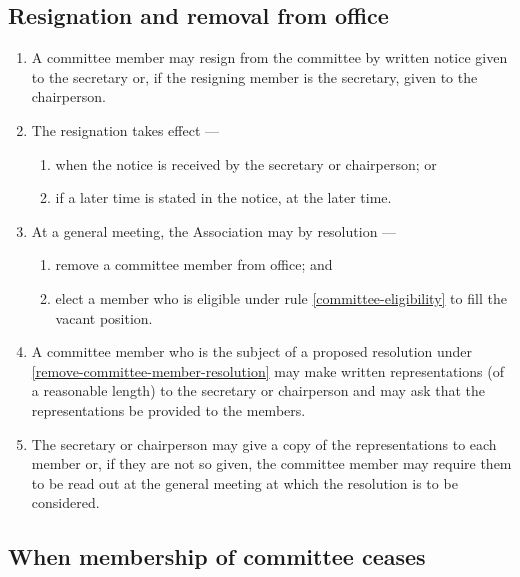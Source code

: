 \documentclass[../constitution.tex]{subfiles}
\begin{document}
\hypertarget{resignation-and-removal-from-office}{%
\subsection{Resignation and removal from office}\label{resignation-and-removal-from-office}}

\begin{enumerate}

\item A committee member may resign from the committee by written notice given to the secretary or, if the resigning member is the secretary, given to the chairperson.
\item The resignation takes effect ---

  \begin{enumerate}
  
  \item when the notice is received by the secretary or chairperson; or
  \item if a later time is stated in the notice, at the later time.
  \end{enumerate}
\item At a general meeting, the Association may by resolution --- 

  \begin{enumerate}
  
  \item remove a committee member from office; and \label{remove-committee-member-resolution}
  \item elect a member who is eligible under rule \ref{committee-eligibility} to fill the vacant position. \label{elect-committee-at-general-meeting}
  \end{enumerate}
\item A committee member who is the subject of a proposed resolution under  \ref{remove-committee-member-resolution} may make written representations (of a reasonable length) to the secretary or chairperson and may ask that the representations be provided to the members.
\item The secretary or chairperson may give a copy of the representations to each member or, if they are not so given, the committee member may require them to be read out at the general meeting at which the resolution is to be considered.
\end{enumerate}

\hypertarget{when-membership-of-committee-ceases}{%
\subsection{When membership of committee ceases}\label{when-membership-of-committee-ceases}}
\end{document}
